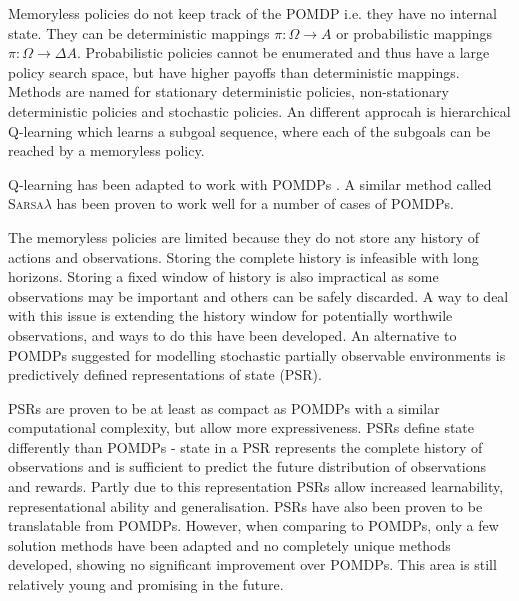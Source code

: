 Memoryless policies do not keep track of the POMDP i.e. they have no internal
state. They can be deterministic mappings \(\pi : \Omega \rightarrow A \) or
probabilistic mappings \(\pi : \Omega \rightarrow \Delta A \). Probabilistic
policies cannot be enumerated and thus have a large policy search space, but
have higher payoffs than deterministic mappings. Methods are named for
stationary deterministic policies, non-stationary deterministic policies and
stochastic policies. An different approcah is hierarchical Q-learning which
learns a subgoal sequence, where each of the subgoals can be reached by a
memoryless policy. \parencite{Spaan2012ai+pomdp}

Q-learning has been adapted to work with POMDPs
\parencite{Russell2010ai+modern, Spaan2012ai+pomdp}. A similar method called
\textsc{Sarsa\(\lambda\)} has been proven to work well for a number of cases of
POMDPs.

The memoryless policies are limited because they do not store any history of
actions and observations. Storing the complete history is infeasible with long
horizons. Storing a fixed window of history is also impractical as some
observations may be important and others can be safely discarded. A way to deal
with this issue is extending the history window for potentially worthwile
observations, and ways to do this have been developed. An alternative to POMDPs
suggested for modelling stochastic partially observable environments is
predictively defined representations of state (PSR).
\parencite{Spaan2012ai+pomdp}

PSRs are proven to be at least as compact as POMDPs with a similar
computational complexity, but allow more expressiveness. PSRs define state
differently than POMDPs - state in a PSR represents the complete history of
observations and is sufficient to predict the future distribution of
observations and rewards. Partly due to this representation PSRs allow
increased learnability, representational ability and generalisation. PSRs have
also been proven to be translatable from POMDPs. However, when comparing to
POMDPs, only a few solution methods have been adapted and no completely unique
methods developed, showing no significant improvement over POMDPs. This area is
still relatively young and promising in the future.
\parencite{Wingate2012ai+psr}

